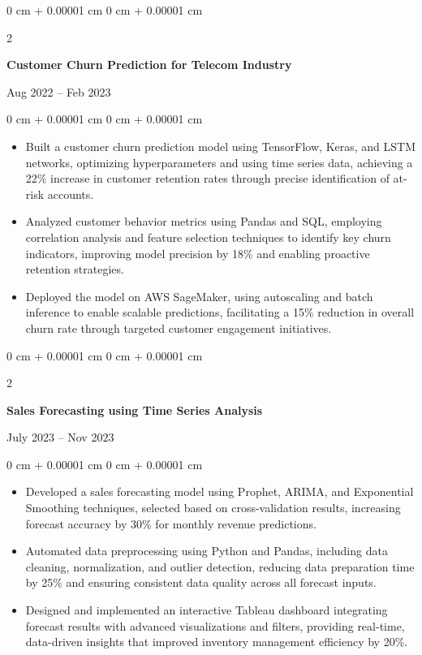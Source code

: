 \documentclass[9pt, letterpaper]{article}
\newenvironment{highlights}{
    \begin{itemize}[
        topsep=0.03 cm,  %
        parsep=0.03 cm,  %
        partopsep=0pt,
        itemsep=0pt,
        leftmargin=0 cm + 8pt %
    ]
    \justifying
}{
    \end{itemize}
}
\newenvironment{onecolentry}{
    \begin{adjustwidth}{
        0 cm + 0.00001 cm
    }{
        0 cm + 0.00001 cm
    }
}{
    \end{adjustwidth}
}
\newenvironment{twocolentry}[2][]{
    \onecolentry
    \def\secondColumn{#2}
    \setcolumnwidth{\fill, 4.3 cm}  %
    \begin{paracol}{2}
}{
    \switchcolumn \raggedleft \secondColumn
    \end{paracol}
    \endonecolentry
}
\begin{document}
\vspace{0.15 cm}

\begin{twocolentry}{
    Aug 2022 – Feb 2023
}
    \textbf{Customer Churn Prediction for Telecom Industry}
\end{twocolentry}

\vspace{0.05 cm}

\begin{onecolentry}
    \begin{highlights}
        \item Built a customer churn prediction model using TensorFlow, Keras, and LSTM networks, optimizing hyperparameters and using time series data, achieving a 22\% increase in customer retention rates through precise identification of at-risk accounts.
        \item Analyzed customer behavior metrics using Pandas and SQL, employing correlation analysis and feature selection techniques to identify key churn indicators, improving model precision by 18\% and enabling proactive retention strategies.
        \item Deployed the model on AWS SageMaker, using autoscaling and batch inference to enable scalable predictions, facilitating a 15\% reduction in overall churn rate through targeted customer engagement initiatives.
    \end{highlights}
\end{onecolentry}

\vspace{0.15 cm}

\begin{twocolentry}{
    July 2023 – Nov 2023
}
    \textbf{Sales Forecasting using Time Series Analysis}
\end{twocolentry}

\vspace{0.05 cm}

\begin{onecolentry}
    \begin{highlights}
        \item Developed a sales forecasting model using Prophet, ARIMA, and Exponential Smoothing techniques, selected based on cross-validation results, increasing forecast accuracy by 30\% for monthly revenue predictions.
        \item Automated data preprocessing using Python and Pandas, including data cleaning, normalization, and outlier detection, reducing data preparation time by 25\% and ensuring consistent data quality across all forecast inputs.
        \item Designed and implemented an interactive Tableau dashboard integrating forecast results with advanced visualizations and filters, providing real-time, data-driven insights that improved inventory management efficiency by 20\%.
    \end{highlights}
\end{onecolentry}
\end{document}
